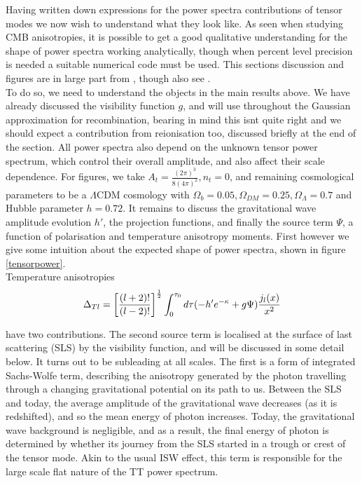 \documentclass[a4paper,10pt]{article}
\newcommand{\half}{\frac{1}{2}}
\newcommand{\ltwo}{\left[\frac{(l+2)!}{(l-2)!}\right]}
\begin{document}
Having written down expressions for the power spectra contributions of tensor modes we now wish to understand what they look like. As seen when studying CMB anisotropies, it is possible to get a good qualitative understanding for the shape of power spectra working analytically, though when percent level precision is needed a suitable numerical code must be used. This sections discussion and figures are in large part from \cite{Pritchard}, though also see \cite{zhao}.\\

To do so, we need to understand the objects in the main results above. We have already discussed the visibility function $g$, and will use throughout the Gaussian approximation for recombination, bearing in mind this isnt quite right and we should expect a contribution from reionisation too, discussed briefly at the end of the section. All power spectra also depend on the unknown tensor power spectrum, which control their overall amplitude, and also affect their scale dependence. For figures, we take  $A_t = \frac{(2\pi)^3}{8(4\pi)^2}, n_t=0$, and remaining cosmological parameters to be a $\Lambda$CDM cosmology with $\Omega_b=0.05, \Omega_{DM}=0.25, \Omega_\Lambda=0.7$ and Hubble parameter $h=0.72$. It remains to discuss the gravitational wave amplitude evolution $h'$, the projection functions, and finally the source term $\Psi$, a function of polarisation and temperature anisotropy moments. First however we give some intuition about the expected shape of power spectra, shown in figure \ref{tensorpower}.\\

Temperature anisotropies 
\begin{equation}
\Delta_{Tl} = \ltwo^\half \int_0^{\tau_0} d\tau (-h'e^{-\kappa}+g\Psi)\frac{j_l(x)}{x^2}\\
\end{equation}

have two contributions. The second source term is localised at the surface of last scattering (SLS) by the visibility function, and will be discussed in some detail below. It turns out to be subleading at all scales. The first is a form of integrated Sachs-Wolfe term, describing the anisotropy generated by the photon travelling through a changing gravitational potential on its path to us. Between the SLS and today, the average amplitude of the gravitational wave decreases (as it is redshifted), and so the mean energy of photon increases. Today, the gravitational wave background is negligible, and as a result, the final energy of photon is determined by whether its journey from the SLS started in a trough or crest of the tensor mode. Akin to the usual ISW effect, this term is responsible for the large scale flat nature of the TT power spectrum.\\
\end{document}
